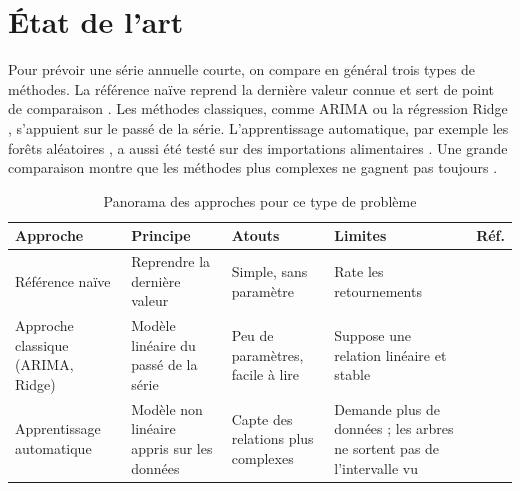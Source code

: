 \documentclass[11pt,a4paper]{article}
\begin{document}
\section{État de l'art}
\label{sec:etat}
Pour prévoir une série annuelle courte, on compare en général trois types de méthodes. La référence naïve reprend la dernière valeur connue et sert de point de comparaison \cite{etat1}. Les méthodes classiques, comme ARIMA \cite{etat2} ou la régression Ridge \cite{etat3}, s'appuient sur le passé de la série. L'apprentissage automatique, par exemple les forêts aléatoires \cite{etat4}, a aussi été testé sur des importations alimentaires \cite{etat5}. Une grande comparaison montre que les méthodes plus complexes ne gagnent pas toujours \cite{lie1}.

\begin{table}[htbp]
  \centering
  \caption{Panorama des approches pour ce type de problème}
  \label{tab:etat}
  \small
  \begin{tabular}{@{}P{3cm} P{4.3cm} P{3.5cm} P{3.5cm} l@{}}
    \toprule
    Approche & Principe & Atouts & Limites & Réf. \\
    \midrule
    Référence naïve & Reprendre la dernière valeur & Simple, sans paramètre & Rate les retournements & \cite{etat1} \\
    Approche classique (ARIMA, Ridge) & Modèle linéaire du passé de la série & Peu de paramètres, facile à lire & Suppose une relation linéaire et stable & \cite{etat2,etat3} \\
    Apprentissage automatique & Modèle non linéaire appris sur les données & Capte des relations plus complexes & Demande plus de données ; les arbres ne sortent pas de l'intervalle vu & \cite{etat4,etat5} \\
    \bottomrule
  \end{tabular}
\end{table}

\end{document}
